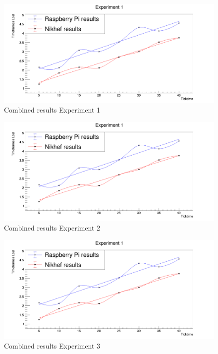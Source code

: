 \begin{figure}[!h]
	\centering
	\includegraphics[width=\textwidth,height=\textheight,keepaspectratio]{./graphics/ex1_combined.png}
	\caption{Combined results Experiment 1}
	\label{fig:Ex1Combined}
\end{figure}
\begin{figure}[!h]
	\centering
	\includegraphics[width=\textwidth,height=\textheight,keepaspectratio]{./graphics/ex1_combined.png}
	\caption{Combined results Experiment 2}
	\label{fig:Ex2Combined}
\end{figure}
\begin{figure}[!h]
	\centering
	\includegraphics[width=\textwidth,height=\textheight,keepaspectratio]{./graphics/ex1_combined.png}
	\caption{Combined results Experiment 3}
	\label{fig:Ex3Combined}
\end{figure}

